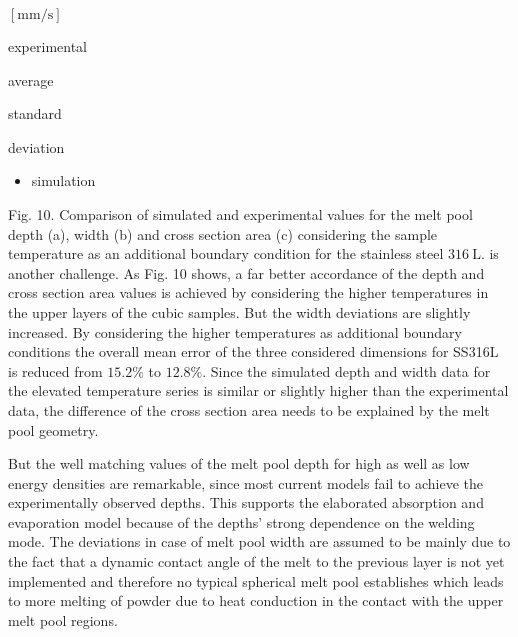 \documentclass[10pt]{article}
\begin{document}
$[\mathrm{mm} / \mathrm{s}]$

experimental

average

standard

deviation

\begin{itemize}
  \item simulation
\end{itemize}

Fig. 10. Comparison of simulated and experimental values for the melt pool depth (a), width (b) and cross section area (c) considering the sample temperature as an additional boundary condition for the stainless steel $316 \mathrm{~L}$. is another challenge. As Fig. 10 shows, a far better accordance of the depth and cross section area values is achieved by considering the higher temperatures in the upper layers of the cubic samples. But the width deviations are slightly increased. By considering the higher temperatures as additional boundary conditions the overall mean error of the three considered dimensions for SS316L is reduced from $15.2 \%$ to $12.8 \%$. Since the simulated depth and width data for the elevated temperature series is similar or slightly higher than the experimental data, the difference of the cross section area needs to be explained by the melt pool geometry.

But the well matching values of the melt pool depth for high as well as low energy densities are remarkable, since most current models fail to achieve the experimentally observed depths. This supports the elaborated absorption and evaporation model because of the depths' strong dependence on the welding mode. The deviations in case of melt pool width are assumed to be mainly due to the fact that a dynamic contact angle of the melt to the previous layer is not yet implemented and therefore no typical spherical melt pool establishes which leads to more melting of powder due to heat conduction in the contact with the upper melt pool regions.
\end{document}
